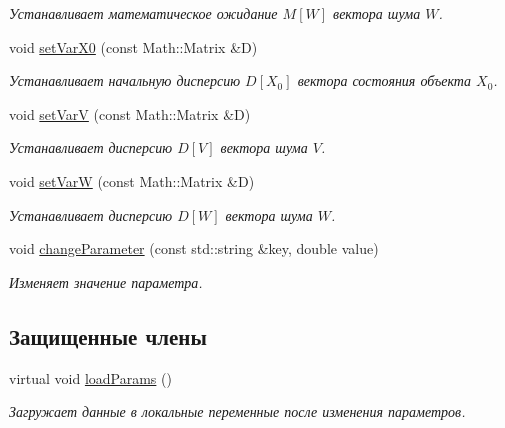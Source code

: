 \begin{DoxyCompactItemize}
\begin{DoxyCompactList}\small\item\em Устанавливает математическое ожидание $M[W]$ вектора шума $W$. \end{DoxyCompactList}\item 
\hypertarget{class_core_1_1_task_a206375f8b4993105a0edf965199e6f39}{}\label{class_core_1_1_task_a206375f8b4993105a0edf965199e6f39} 
void \hyperlink{class_core_1_1_task_a206375f8b4993105a0edf965199e6f39}{set\+Var\+X0} (const Math\+::\+Matrix \&D)
\begin{DoxyCompactList}\small\item\em Устанавливает начальную дисперсию $D[X_0]$ вектора состояния объекта $X_0$. \end{DoxyCompactList}\item 
\hypertarget{class_core_1_1_task_ae5fcf63bba5f0391e1bc932aec238a6e}{}\label{class_core_1_1_task_ae5fcf63bba5f0391e1bc932aec238a6e} 
void \hyperlink{class_core_1_1_task_ae5fcf63bba5f0391e1bc932aec238a6e}{set\+VarV} (const Math\+::\+Matrix \&D)
\begin{DoxyCompactList}\small\item\em Устанавливает дисперсию $D[V]$ вектора шума $V$. \end{DoxyCompactList}\item 
\hypertarget{class_core_1_1_task_ad326146b1416656c3e42138f0f7cadac}{}\label{class_core_1_1_task_ad326146b1416656c3e42138f0f7cadac} 
void \hyperlink{class_core_1_1_task_ad326146b1416656c3e42138f0f7cadac}{set\+VarW} (const Math\+::\+Matrix \&D)
\begin{DoxyCompactList}\small\item\em Устанавливает дисперсию $D[W]$ вектора шума $W$. \end{DoxyCompactList}\item 
void \hyperlink{class_core_1_1_task_ac8b451d78816e62347954452b7ace250}{change\+Parameter} (const std\+::string \&key, double value)
\begin{DoxyCompactList}\small\item\em Изменяет значение параметра. \end{DoxyCompactList}\end{DoxyCompactItemize}
\subsection*{Защищенные члены}
\begin{DoxyCompactItemize}
\item 
\hypertarget{class_core_1_1_task_a36027d8797e1bbaac2db06d0dd72aec9}{}\label{class_core_1_1_task_a36027d8797e1bbaac2db06d0dd72aec9} 
virtual void \hyperlink{class_core_1_1_task_a36027d8797e1bbaac2db06d0dd72aec9}{load\+Params} ()
\begin{DoxyCompactList}\small\item\em Загружает данные в локальные переменные после изменения параметров. \end{DoxyCompactList}\end{DoxyCompactItemize}
